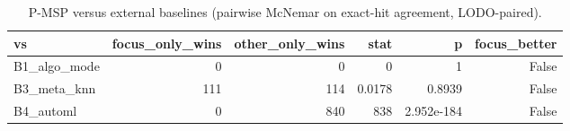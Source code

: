 \begin{table}
\caption{P-MSP versus external baselines (pairwise McNemar on exact-hit agreement, LODO-paired).}
\label{tab:pmsp_external}
\begin{tabular}{lrrrrr}
\toprule
vs & focus\_only\_wins & other\_only\_wins & stat & p & focus\_better \\
\midrule
B1\_algo\_mode & 0 & 0 & 0 & 1 & False \\
B3\_meta\_knn & 111 & 114 & 0.0178 & 0.8939 & False \\
B4\_automl & 0 & 840 & 838 & 2.952e-184 & False \\
\bottomrule
\end{tabular}
\end{table}
